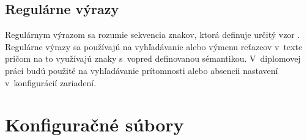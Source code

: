  \subsection{Regulárne výrazy}
 Regulárnym výrazom sa rozumie sekvencia znakov, ktorá definuje určitý vzor \cite{sBBUt3Q3bPUfAMue}. Regulárne výrazy sa používajú na vyhľadávanie alebo výmenu reťazcov v~texte pričom na to využívajú znaky s~vopred definovanou sémantikou. V~diplomovej práci budú použité na vyhľadávanie prítomnosti alebo absencii nastavení v~konfigurácií zariadení. 
 \newpage
\section{Konfiguračné súbory}
